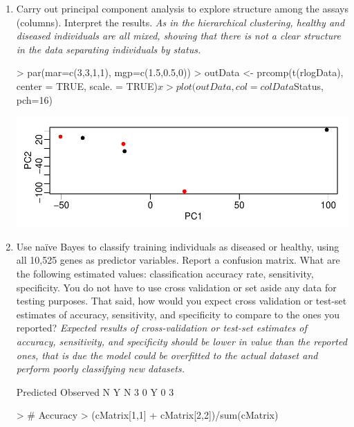 \documentclass[12pt,a4paper]{paper}
\begin{document}
\begin{enumerate}
\begin{enumerate}
\begin{enumerate}
\item Carry out principal component analysis to explore structure among the assays (columns). Interpret the results. \textit{As in the hierarchical clustering, healthy and diseased individuals are all mixed, showing that there is not a clear structure in the data separating individuals by status.}
\begin{Schunk}
\begin{Sinput}
> par(mar=c(3,3,1,1), mgp=c(1.5,0.5,0))
> outData <- prcomp(t(rlogData), center = TRUE, scale. = TRUE)$x
> plot(outData, col= colData$Status, pch=16)
\end{Sinput}
\end{Schunk}
\includegraphics{Osorio_Daniel_E2-004}
\item Use naïve Bayes to classify training individuals as diseased or healthy, using all 10,525 genes as predictor variables. Report a confusion matrix. What are the following estimated values: classification accuracy rate, sensitivity, specificity. You do not have to use cross validation or set aside any data for testing purposes. That said, how would you expect cross validation or test-set estimates of accuracy, sensitivity, and specificity to compare to the ones you reported? \textit{Expected results of cross-validation or test-set estimates of accuracy, sensitivity, and specificity should be lower in value than the reported ones, that is due the model could be overfitted to the actual dataset and perform poorly classifying new datasets.}
\begin{Schunk}
\begin{Soutput}
        Predicted
Observed N Y
       N 3 0
       Y 0 3
\end{Soutput}
\begin{Sinput}
> # Accuracy
> (cMatrix[1,1] + cMatrix[2,2])/sum(cMatrix)

\end{Sinput}
\end{Schunk}
\end{enumerate}
\end{enumerate}
\end{enumerate}
\end{document}
